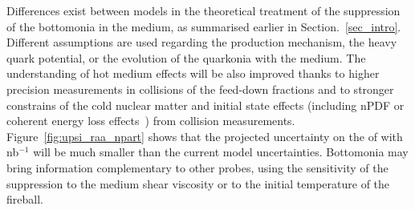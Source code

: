 \documentclass[../report.tex]{subfiles}
\providecommand{\main}{..}
\begin{document}
% 



Differences exist between models in the theoretical treatment of the suppression of the bottomonia in the medium, as summarised earlier in Section.~\ref{sec_intro}.
Different assumptions are used regarding the production mechanism, the heavy quark potential, or the evolution of the quarkonia with the medium. 
The understanding of hot medium effects will be also improved thanks to higher precision measurements in \pp collisions of the feed-down fractions
   and to stronger constrains of the cold nuclear matter and initial state effects (including nPDF or coherent energy loss effects~\cite{Arleo:2014oha}) from \pPb collision measurements.
Figure~\ref{fig:upsi_raa_npart} shows that the projected uncertainty on the \raa of \PGU with \unit[10]{nb}$^{-1}$ will be much smaller than the current model uncertainties.
Bottomonia may bring information
complementary to other probes, using the sensitivity of the suppression to the medium shear viscosity or to the initial temperature of the fireball.
\end{document}
